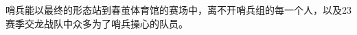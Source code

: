 
\begin{acknowledgements}
  哨兵能以最终的形态站到春茧体育馆的赛场中，离不开哨兵组的每一个人，以及23赛季交龙战队中众多为了哨兵操心的队员。
\end{acknowledgements}
